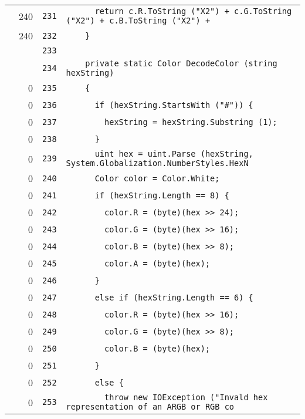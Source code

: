 \documentclass[a4paper,10pt]{article}
\begin{document}
\begin{longtable}[l]{lrrl}
\cellcolor{green} & 240 & \verb~231~ & \verb~      return c.R.ToString ("X2") + c.G.ToString ("X2") + c.B.ToString ("X2") +~\\
\cellcolor{green} & 240 & \verb~232~ & \verb~    }~\\
\cellcolor{gray} &  & \verb~233~ & \verb~~\\
\cellcolor{gray} &  & \verb~234~ & \verb~    private static Color DecodeColor (string hexString)~\\
\cellcolor{red} & 0 & \verb~235~ & \verb~    {~\\
\cellcolor{red} & 0 & \verb~236~ & \verb~      if (hexString.StartsWith ("#")) {~\\
\cellcolor{red} & 0 & \verb~237~ & \verb~        hexString = hexString.Substring (1);~\\
\cellcolor{red} & 0 & \verb~238~ & \verb~      }~\\
\cellcolor{red} & 0 & \verb~239~ & \verb~      uint hex = uint.Parse (hexString, System.Globalization.NumberStyles.HexN~\\
\cellcolor{red} & 0 & \verb~240~ & \verb~      Color color = Color.White;~\\
\cellcolor{red} & 0 & \verb~241~ & \verb~      if (hexString.Length == 8) {~\\
\cellcolor{red} & 0 & \verb~242~ & \verb~        color.R = (byte)(hex >> 24);~\\
\cellcolor{red} & 0 & \verb~243~ & \verb~        color.G = (byte)(hex >> 16);~\\
\cellcolor{red} & 0 & \verb~244~ & \verb~        color.B = (byte)(hex >> 8);~\\
\cellcolor{red} & 0 & \verb~245~ & \verb~        color.A = (byte)(hex);~\\
\cellcolor{red} & 0 & \verb~246~ & \verb~      }~\\
\cellcolor{red} & 0 & \verb~247~ & \verb~      else if (hexString.Length == 6) {~\\
\cellcolor{red} & 0 & \verb~248~ & \verb~        color.R = (byte)(hex >> 16);~\\
\cellcolor{red} & 0 & \verb~249~ & \verb~        color.G = (byte)(hex >> 8);~\\
\cellcolor{red} & 0 & \verb~250~ & \verb~        color.B = (byte)(hex);~\\
\cellcolor{red} & 0 & \verb~251~ & \verb~      }~\\
\cellcolor{red} & 0 & \verb~252~ & \verb~      else {~\\
\cellcolor{red} & 0 & \verb~253~ & \verb~        throw new IOException ("Invald hex representation of an ARGB or RGB co~\\

\end{longtable}
\end{document}

